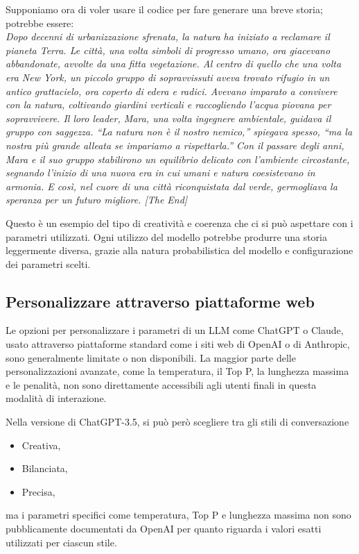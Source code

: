         Supponiamo ora di voler usare il codice per fare generare una breve storia; potrebbe essere:
        \\
        \textit{Dopo decenni di urbanizzazione sfrenata, la natura ha iniziato a reclamare il pianeta Terra. Le città, una volta simboli di progresso umano, ora giacevano abbandonate, avvolte da una fitta vegetazione. Al centro di quello che una volta era New York, un piccolo gruppo di sopravvissuti aveva trovato rifugio in un antico grattacielo, ora coperto di edera e radici. Avevano imparato a convivere con la natura, coltivando giardini verticali e raccogliendo l'acqua piovana per sopravvivere. Il loro leader, Mara, una volta ingegnere ambientale, guidava il gruppo con saggezza. ``La natura non è il nostro nemico,'' spiegava spesso, ``ma la nostra più grande alleata se impariamo a rispettarla.'' Con il passare degli anni, Mara e il suo gruppo stabilirono un equilibrio delicato con l'ambiente circostante, segnando l'inizio di una nuova era in cui umani e natura coesistevano in armonia. E così, nel cuore di una città riconquistata dal verde, germogliava la speranza per un futuro migliore. [The End]}
    
        Questo è un esempio del tipo di creatività e coerenza che ci si può aspettare con i parametri utilizzati. Ogni utilizzo del modello potrebbe produrre una storia leggermente diversa, grazie alla natura probabilistica del modello e configurazione dei parametri scelti.
        
    \subsection{Personalizzare attraverso piattaforme web}
        Le opzioni per personalizzare i parametri di un LLM come ChatGPT o Claude, usato attraverso piattaforme standard come i siti web di OpenAI o di Anthropic, sono generalmente limitate o non disponibili. La maggior parte delle personalizzazioni avanzate, come la temperatura, il Top P, la lunghezza massima e le penalità, non sono direttamente accessibili agli utenti finali in questa modalità di interazione.

        Nella versione di ChatGPT-3.5, si può però scegliere tra gli stili di conversazione
        \begin{itemize}
            \item Creativa,
            \item Bilanciata,
            \item Precisa,
        \end{itemize}
        ma i parametri specifici come temperatura, Top P e lunghezza massima non sono pubblicamente documentati da OpenAI per quanto riguarda i valori esatti utilizzati per ciascun stile.

